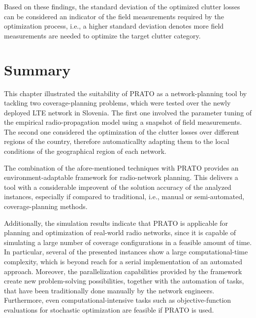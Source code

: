 Based on these findings, the standard deviation of the optimized clutter
losses can be considered an indicator of the field measurements required
by the optimization process, i.e., a higher standard deviation denotes
more field measurements are needed to optimize the target clutter
category.

\clearpage{}


\section{Summary}

This chapter illustrated the suitability of PRATO as a network-planning
tool by tackling two coverage-planning problems, which were tested
over the newly deployed LTE network in Slovenia. The first one involved
the parameter tuning of the empirical radio-propagation model using
a snapshot of field measurements. The second one considered the optimization
of the clutter losses over different regions of the country, therefore
automaticallty adapting them to the local conditions of the geographical
region of each network.

The combination of the afore-mentioned techniques with PRATO provides
an environment-adaptable framework for radio-network planning. This
delivers a tool with a considerable improvent of the solution accuracy
of the analyzed instances, especially if compared to traditional,
i.e., manual or semi-automated, coverage-planning methods.

Additionally, the simulation results indicate that PRATO is applicable
for planning and optimization of real-world radio networks, since
it is capable of simulating a large number of coverage configurations
in a feasible amount of time. In particular, several of the presented
instances show a large computational-time complexity, which is beyond
reach for a serial implementation of an automated approach. Moreover,
the parallelization capabilities provided by the framework create
new problem-solving possibilities, together with the automation of
tasks, that have been traditionally done manually by the network engineers.
Furthermore, even computational-intensive tasks such as objective-function
evaluations for stochastic optimization are feasible if PRATO is used.

